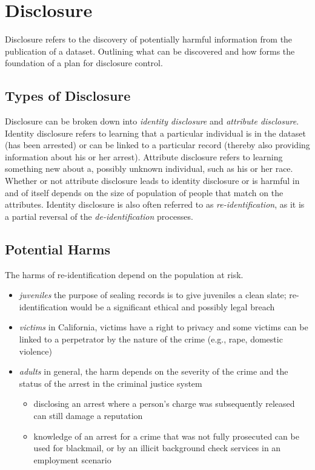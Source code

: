 \documentclass[]{article}
\providecommand{\tightlist}{%
  \setlength{\itemsep}{0pt}\setlength{\parskip}{0pt}}
\begin{document}
\section{Disclosure}\label{disclosure}

Disclosure refers to the discovery of potentially harmful information
from the publication of a dataset. Outlining what can be discovered and
how forms the foundation of a plan for disclosure control.

\subsection{Types of Disclosure}\label{types-of-disclosure}

Disclosure can be broken down into \emph{identity disclosure} and
\emph{attribute disclosure}. Identity disclosure refers to learning that
a particular individual is in the dataset (has been arrested) or can be
linked to a particular record (thereby also providing information about
his or her arrest). Attribute disclosure refers to learning something
new about a, possibly unknown individual, such as his or her race.
Whether or not attribute disclosure leads to identity disclosure or is
harmful in and of itself depends on the size of population of people
that match on the attributes. Identity disclosure is also often referred
to as \emph{re-identification}, as it is a partial reversal of the
\emph{de-identification} processes.

\subsection{Potential Harms}\label{potential-harms}

The harms of re-identification depend on the population at risk.

\begin{itemize}
\tightlist
\item
  \emph{juveniles} the purpose of sealing records is to give juveniles a
  clean slate; re-identification would be a significant ethical and
  possibly legal breach
\item
  \emph{victims} in California, victims have a right to privacy and some
  victims can be linked to a perpetrator by the nature of the crime
  (e.g., rape, domestic violence)
\item
  \emph{adults} in general, the harm depends on the severity of the
  crime and the status of the arrest in the criminal justice system

  \begin{itemize}
  \tightlist
  \item
    disclosing an arrest where a person's charge was subsequently
    released can still damage a reputation
  \item
    knowledge of an arrest for a crime that was not fully prosecuted can
    be used for blackmail, or by an illicit background check services in
    an employment scenario
  \end{itemize}
\end{itemize}
\end{document}
